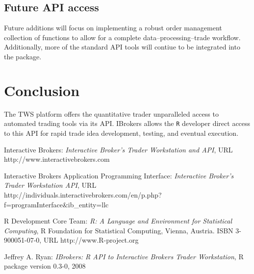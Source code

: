 \documentclass{article}
\begin{document}
\subsection{Future API access}
Future additions will focus on implementing a robust order
management collection of functions to allow for a complete
data--processing--trade workflow. Additionally, more
of the standard API tools will contiue to be integrated into
the package.

\section{Conclusion}
The TWS platform offers the quantitative trader unparalleled
access to automated trading tools via its API.  IBrokers
allows the {\tt R} developer direct access to this API
for rapid trade idea development, testing, and eventual execution.

\begin{thebibliography}{99}
 Interactive Brokers:
\emph{Interactive Broker's \emph{Trader Workstation} and API},
URL http://www.interactivebrokers.com

 Interactive Brokers Application Programming Interface:
\emph{Interactive Broker's \emph{Trader Workstation} API},
URL http://individuals.interactivebrokers.com/en/p.php?f=programInterface\&ib\_entity=llc

 R Development Core Team:
\emph{R: A Language and Environment for Statistical Computing},
R Foundation for Statistical Computing, Vienna, Austria.
ISBN 3-900051-07-0, URL http://www.R-project.org

 Jeffrey A. Ryan:
\emph{IBrokers: R API to Interactive Brokers Trader Workstation},
R package version 0.3-0, 2008
\end{thebibliography}
\end{document}
